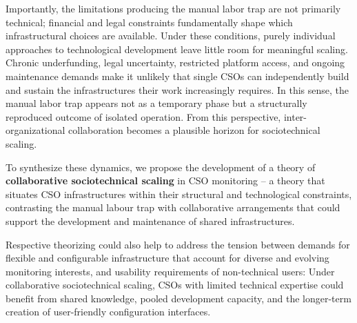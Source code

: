 \documentclass[acmsmall]{acmart}
\begin{document}
Importantly, the limitations producing the manual labor trap are not primarily technical; financial and legal constraints fundamentally shape which infrastructural choices are available. Under these conditions, purely individual approaches to technological development leave little room for meaningful scaling. Chronic underfunding, legal uncertainty, restricted platform access, and ongoing maintenance demands make it unlikely that single CSOs can independently build and sustain the infrastructures their work increasingly requires. In this sense, the manual labor trap appears not as a temporary phase but a structurally reproduced outcome of isolated operation. From this perspective, inter-organizational collaboration becomes a plausible horizon for sociotechnical scaling.

To synthesize these dynamics, we propose the development of a theory of \textbf{collaborative sociotechnical scaling} in CSO monitoring -- a theory that situates CSO infrastructures within their structural and technological constraints, contrasting the manual labour trap with collaborative arrangements that could support the development and maintenance of shared infrastructures.

Respective theorizing could also help to address the tension between demands for flexible and configurable infrastructure that account for diverse and evolving monitoring interests, and usability requirements of non-technical users: Under collaborative sociotechnical scaling, CSOs with limited technical expertise could benefit from shared knowledge, pooled development capacity, and the longer-term creation of user-friendly configuration interfaces. 
\end{document}
